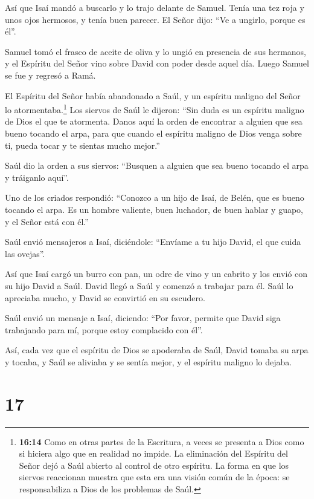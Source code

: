  Así que Isaí mandó a buscarlo y lo trajo delante de
Samuel. Tenía una tez roja y unos ojos hermosos, y tenía buen parecer.
El Señor dijo: ``Ve a ungirlo, porque es él''.

 Samuel tomó el frasco de aceite de oliva y lo ungió en
presencia de sus hermanos, y el Espíritu del Señor vino sobre David con
poder desde aquel día. Luego Samuel se fue y regresó a Ramá.

 El Espíritu del Señor había abandonado a Saúl, y un
espíritu maligno del Señor lo atormentaba.\footnote{\textbf{16:14} Como
  en otras partes de la Escritura, a veces se presenta a Dios como si
  hiciera algo que en realidad no impide. La eliminación del Espíritu
  del Señor dejó a Saúl abierto al control de otro espíritu. La forma en
  que los siervos reaccionan muestra que esta era una visión común de la
  época: se responsabiliza a Dios de los problemas de Saúl.}
 Los siervos de Saúl le dijeron: ``Sin duda es un espíritu
maligno de Dios el que te atormenta.  Danos aquí la orden
de encontrar a alguien que sea bueno tocando el arpa, para que cuando el
espíritu maligno de Dios venga sobre ti, pueda tocar y te sientas mucho
mejor.''

 Saúl dio la orden a sus siervos: ``Busquen a alguien que
sea bueno tocando el arpa y tráiganlo aquí''.

 Uno de los criados respondió: ``Conozco a un hijo de Isaí,
de Belén, que es bueno tocando el arpa. Es un hombre valiente, buen
luchador, de buen hablar y guapo, y el Señor está con él.''

 Saúl envió mensajeros a Isaí, diciéndole: ``Envíame a tu
hijo David, el que cuida las ovejas''.

 Así que Isaí cargó un burro con pan, un odre de vino y un
cabrito y los envió con su hijo David a Saúl.  David llegó
a Saúl y comenzó a trabajar para él. Saúl lo apreciaba mucho, y David se
convirtió en su escudero.

 Saúl envió un mensaje a Isaí, diciendo: ``Por favor,
permite que David siga trabajando para mí, porque estoy complacido con
él''.

 Así, cada vez que el espíritu de Dios se apoderaba de
Saúl, David tomaba su arpa y tocaba, y Saúl se aliviaba y se sentía
mejor, y el espíritu maligno lo dejaba.

\hypertarget{section-16}{%
\section{17}\label{section-16}}

